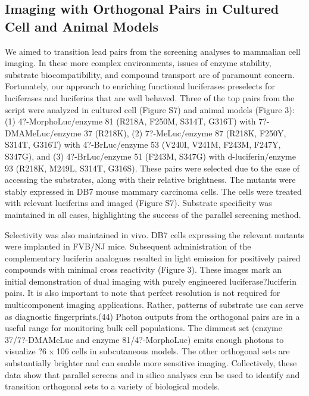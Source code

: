 \subsection*{Imaging with Orthogonal Pairs in Cultured Cell and Animal Models}
We aimed to transition lead pairs from the screening analyses to mammalian cell imaging. In these more complex environments, issues of enzyme stability, substrate biocompatibility, and compound transport are of paramount concern. Fortunately, our approach to enriching functional luciferases preselects for luciferases and luciferins that are well behaved. Three of the top pairs from the script were analyzed in cultured cell (Figure S7) and animal models (Figure 3): (1) 4?-MorphoLuc/enzyme 81 (R218A, F250M, S314T, G316T) with 7?-DMAMeLuc/enzyme 37 (R218K), (2) 7?-MeLuc/enzyme 87 (R218K, F250Y, S314T, G316T) with 4?-BrLuc/enzyme 53 (V240I, V241M, F243M, F247Y, S347G), and (3) 4?-BrLuc/enzyme 51 (F243M, S347G) with d-luciferin/enzyme 93 (R218K, M249L, S314T, G316S). These pairs were selected due to the ease of accessing the substrates, along with their relative brightness. The mutants were stably expressed in DB7 mouse mammary carcinoma cells. The cells were treated with relevant luciferins and imaged (Figure S7). Substrate specificity was maintained in all cases, highlighting the success of the parallel screening method.
\par
Selectivity was also maintained in vivo. DB7 cells expressing the relevant mutants were implanted in FVB/NJ mice. Subsequent administration of the complementary luciferin analogues resulted in light emission for positively paired compounds with minimal cross reactivity (Figure 3). These images mark an initial demonstration of dual imaging with purely engineered luciferase?luciferin pairs. It is also important to note that perfect resolution is not required for multicomponent imaging applications. Rather, patterns of substrate use can serve as diagnostic fingerprints.(44) Photon outputs from the orthogonal pairs are in a useful range for monitoring bulk cell populations. The dimmest set (enzyme 37/7?-DMAMeLuc and enzyme 81/4?-MorphoLuc) emits enough photons to visualize ?6 x 106 cells in subcutaneous models. The other orthogonal sets are substantially brighter and can enable more sensitive imaging. Collectively, these data show that parallel screens and in silico analyses can be used to identify and transition orthogonal sets to a variety of biological models.

